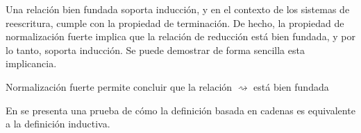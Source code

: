 Una relación bien fundada soporta inducción, y en el contexto de los sistemas de reescritura, cumple con la propiedad de terminación.
De hecho, la propiedad de normalización fuerte implica que la relación de reducción está bien fundada, y por lo tanto, soporta inducción.
Se puede demostrar de forma sencilla esta implicancia.

\begin{codigo}
	Normalización fuerte permite concluir que la relación $\rightsquigarrow$ está bien fundada
\end{codigo}

En \cite[Sección 2.2]{TRAT} se presenta una prueba de cómo la definición basada en cadenas es equivalente a la definición inductiva.
